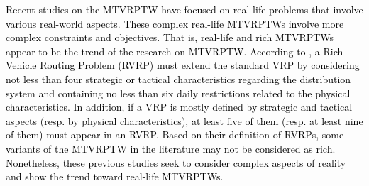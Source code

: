 \documentclass[11pt]{article}
\newcommand\add[1]{\textcolor{black}{#1}}
\begin{document}

\add{Recent studies on the MTVRPTW have focused on real-life problems that involve various real-world aspects.  These complex real-life MTVRPTWs involve more complex constraints and objectives.  That is, real-life and rich MTVRPTWs appear to be the trend of the research on MTVRPTW.  According to \cite{lahyani2015rich}, a Rich Vehicle Routing Problem (RVRP) must extend the standard VRP by considering not less than four strategic or tactical characteristics regarding the distribution system and containing no less than six daily restrictions related to the physical characteristics.  In addition, if a VRP is mostly defined by strategic and tactical aspects (resp. by physical characteristics), at least five of them (resp. at least nine of them) must appear in an RVRP.  Based on their definition of RVRPs, some variants of the MTVRPTW in the literature may not be considered as rich.  Nonetheless, these previous studies seek to consider complex aspects of reality and show the trend toward real-life MTVRPTWs.}
\newline


\end{document}
